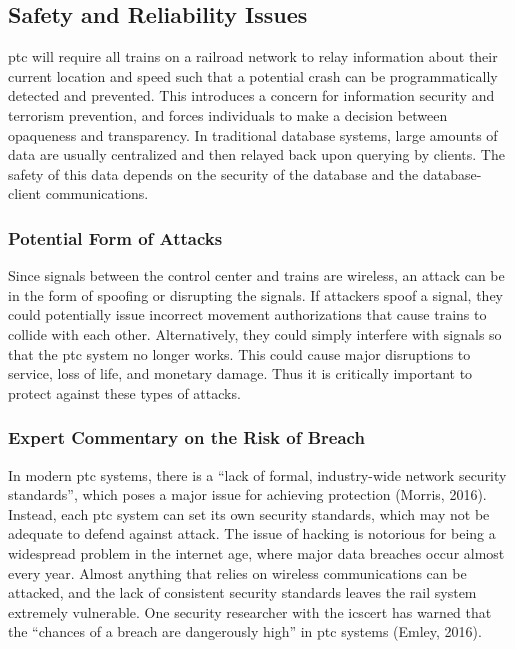 \documentclass[11pt, titlepage]{article}
\begin{document}
\subsection{Safety and Reliability Issues}

\gls{ptc} will require all trains on a railroad network to relay information about
their current location and speed such that a potential crash can be programmatically
detected and prevented. This introduces a concern for information security and
terrorism prevention, and forces individuals to make a decision between opaqueness
and transparency. In traditional database systems, large amounts of data are usually
centralized and then relayed back upon querying by clients. The safety of this data
depends on the security of the database and the database-client communications.

\subsubsection{Potential Form of Attacks}

Since signals between the control center and trains are wireless, an attack can be
in the form of spoofing or disrupting the signals. If attackers spoof a signal, they
could potentially issue incorrect movement authorizations that cause trains to
collide with each other. Alternatively, they could simply interfere with signals so
that the \gls{ptc} system no longer works. This could cause major disruptions to
service, loss of life, and monetary damage. Thus it is critically important to
protect against these types of attacks.

\subsubsection{Expert Commentary on the Risk of Breach}

In modern \gls{ptc} systems, there is a ``lack of formal, industry-wide network
security standards'', which poses a major issue for achieving protection (Morris,
2016). Instead, each \gls{ptc} system can set its own security standards, which may
not be adequate to defend against attack. The issue of hacking is notorious for
being a widespread problem in the internet age, where major data breaches occur
almost every year. Almost anything that relies on wireless communications can be
attacked, and the lack of consistent security standards leaves the rail system
extremely vulnerable. One security researcher with  the \gls{icscert} has warned
that the ``chances of a breach are dangerously high'' in \gls{ptc} systems (Emley,
2016).
\end{document}
